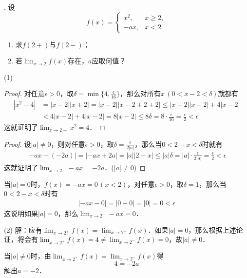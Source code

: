 . 设
\begin{equation}
    f(x) = \begin{cases}
        x^2, & x \geq 2, \\
        -ax, & x < 2
    \end{cases}
\end{equation}
\begin{enumerate}
    \item 求$f(2+)$与$f(2-)$；
    \item 若$\displaystyle\lim_{x \to 2} f(x)$存在，$a$应取何值？
\end{enumerate}

\noindent (1)
\begin{proof}
    对任意$\epsilon > 0$，取$\delta = \min \{ 4, \displaystyle\frac{\epsilon}{16} \}$，那么对所有$x \, (0 < x - 2 < \delta)$就都有
    \begin{align}
        |x^2 - 4| &= |x-2||x+2| = |x-2||x-2 + 2 +2| \leq |x-2||x-2| + 4|x-2| \\
        &< 4|x-2| + 4|x-2| = 8|x-2| \leq 8 \delta = 8 \cdot \frac{\epsilon}{16} = \frac{\epsilon}{2} < \epsilon
    \end{align}
这就证明了$\displaystyle\lim_{x \to 2+} x^2 = 4$．
\end{proof}

\begin{proof}
设$|a| \neq 0$，则对任意$\epsilon > 0$，取$\delta = \displaystyle\frac{\epsilon}{2|a|}$，那么当$0 < 2 - x < \delta$时就有
\begin{align}
|-ax - (-2a)| = |-ax + 2a| = |a||2-x| \leq |a|\delta = |a| \cdot \frac{\epsilon}{2 |a|} = \frac{\epsilon}{2} < \epsilon
\end{align}
这就证明了$\displaystyle\lim_{x \to 2^-} -ax = -2a$．($|a| \neq 0$)
\end{proof}

\noindent 当$|a|=0$时，$f(x) = -ax = 0 \, (x < 2)$，对任意$\epsilon > 0$，取$\delta = 1$，那么当$0 < 2 - x < \delta$时有
\begin{align}
    |-ax - 0| = |0 - 0| = |0| = 0 < \epsilon
\end{align}
这说明如果$|a|=0$，那么$\displaystyle\lim_{x \to 2^-} -ax = 0$．

\noindent (2) 解：应有$\displaystyle \lim_{x \to 2^+} f(x) = \displaystyle\lim_{x \to 2^-} f(x)$．如果$|a| = 0$，那么根据上述论证，将会有$\displaystyle\lim_{x \to 2^+} f(x) = 4 \neq \displaystyle\lim_{x \to 2^-} f(x) = 0$，故$|a|\neq 0$．

\noindent 当$|a| \neq 0$时，由$\displaystyle\lim_{x \to 2^+} f(x) = \displaystyle\lim_{x \to 2^-} f(x)$得
\begin{equation}
    4 = -2a
\end{equation}
解出$a = -2$．

